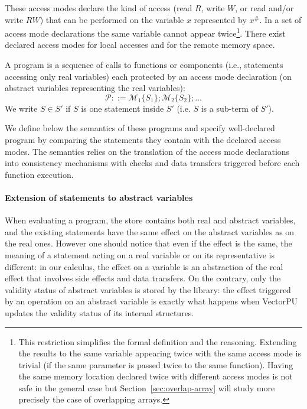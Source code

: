 \documentclass[preprint,12pt]{elsarticle}
\newcommand{\abs}[1]{#1^\#}
\newcommand{\AM}{\mathcal{M}}
\newcommand{\Prog}{\mathcal{P}}
\begin{document}
These access modes declare the kind of access (read $R$, write $W$, or read and/or write 
$RW$) that 
can be performed on the variable $x$ represented by $\abs x$. In a set 
of access mode declarations the same variable cannot appear twice\footnote{This restriction simplifies the formal definition and the reasoning. Extending the results to the same variable appearing twice with the same access mode is trivial (if the same parameter is passed twice to the same function). Having the same memory location declared twice with different access modes is not safe in the general case but Section~\ref{sec:overlap-array} will study more precisely the case of overlapping arrays.}. There exist declared 
access modes for  local accesses and for  the 
remote memory space.

A program is a sequence of calls to functions or components (i.e., statements accessing 
only real variables) 
each protected by an access 
mode declaration (on abstract variables representing the real variables):
\[\Prog::=\AM_1\{S_1\};\AM_2\{S_2\};\ldots\]
We write  $S\in S'$ if $S$ is one statement inside $S'$ (i.e. $S$ is a sub-term of 
$S'$).

We  define below the semantics of these programs  and specify well-declared program by 
comparing the statements they contain with 
the declared access modes. The semantics relies on the translation of 
the access mode declarations into consistency mechanisms 
with checks and data transfers 
triggered 
before each function 
execution.


\paragraph{Extension of statements to abstract variables}
When evaluating a program, the store contains both real and abstract variables, and the 
existing 
statements have the same effect on the abstract variables as on the real ones. However 
one should notice that 
even if the effect is the same, the meaning of a statement acting on a real variable 
or on its representative is different: in our calculus, the effect on a variable is an 
abstraction of the real effect that involves side effects and data transfers. On the 
contrary, only the validity status of abstract variables is stored by the library: the 
effect triggered by an operation on an abstract variable is exactly what happens when 
VectorPU updates the validity status of its internal structures.
\end{document}
